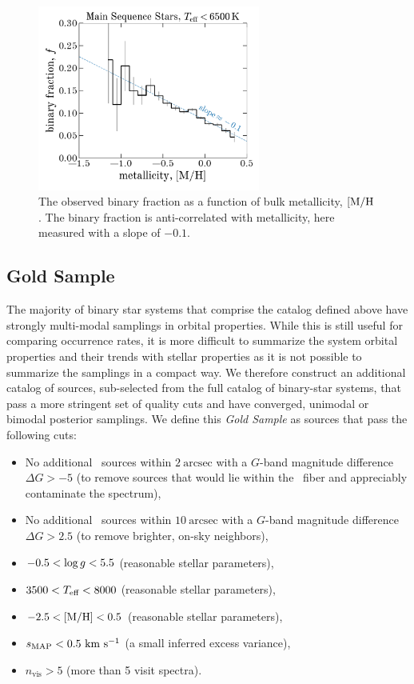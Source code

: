 \documentclass[modern]{aastex63}
\begin{document}
\begin{figure}[!t]
    \begin{center}
    \includegraphics[width=0.65\textwidth]{fraction_M_H.pdf}
    \end{center}
    \caption{%
    The observed binary fraction as a function of bulk metallicity, $[{\rm
    M}/{\rm H}$.
    The binary fraction is anti-correlated with metallicity, here measured with
    a slope of $-0.1$.
    \label{fig:binfrac-mh}
    }
\end{figure}


\subsection{Gold Sample}

The majority of binary star systems that comprise the catalog defined above have
strongly multi-modal samplings in orbital properties.
While this is still useful for comparing occurrence rates, it is more difficult
to summarize the system orbital properties and their trends with stellar
properties as it is not possible to summarize the samplings in a compact way.
We therefore construct an additional catalog of sources, sub-selected from the
full catalog of binary-star systems, that pass a more stringent set of quality
cuts and have converged, unimodal or bimodal posterior samplings.
We define this \textit{Gold Sample} as sources that pass the following cuts:
\begin{itemize}
    \item No additional \gaia\ sources within $2~\textrm{arcsec}$ with a
          $G$-band magnitude difference $\Delta G > -5$ (to remove sources that
          would lie within the \apogee\ fiber and appreciably contaminate the
          spectrum),
    \item No additional \gaia\ sources within $10~\textrm{arcsec}$ with a
          $G$-band magnitude difference $\Delta G > 2.5$ (to remove brighter,
          on-sky neighbors),
    \item $-0.5 < \log g < 5.5$ (reasonable stellar parameters),
    \item $3500 < T_{\textrm{eff}} < 8000$ (reasonable stellar parameters),
    \item $-2.5 < {[{\rm M}/{\rm H}]} < 0.5$ (reasonable stellar parameters),
    \item $s_{\textrm{MAP}} < 0.5~\mathrm{km}~\mathrm{s}^{-1}$ (a small inferred excess variance),
    \item $n_{\textrm{vis}} > 5$ (more than 5 visit spectra).
\end{itemize}
\end{document}
